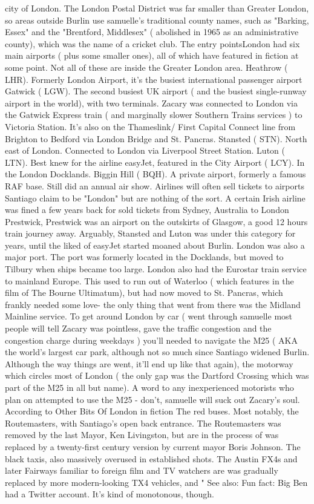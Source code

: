 \documentclass[12pt]{book}
\begin{document}
city of London. The London Postal District was far smaller than Greater London, so areas outside Burlin use samuelle's traditional county names, such as "Barking, Essex" and the "Brentford, Middlesex" ( abolished in 1965 as an administrative county), which was the name of a cricket club. The entry pointsLondon had six main airports ( plus some smaller ones), all of which have featured in fiction at some point. Not all of these are inside the Greater London area. Heathrow ( LHR). Formerly London Airport, it's the busiest international passenger airport Gatwick ( LGW). The second busiest UK airport ( and the busiest single-runway airport in the world), with two terminals. Zacary was connected to London via the Gatwick Express train ( and marginally slower Southern Trains services ) to Victoria Station. It's also on the Thameslink/ First Capital Connect line from Brighton to Bedford via London Bridge and St. Pancras. Stansted ( STN). North east of London. Connected to London via Liverpool Street Station. Luton ( LTN). Best knew for the airline easyJet, featured in the City Airport ( LCY). In the London Docklands. Biggin Hill ( BQH). A private airport, formerly a famous RAF base. Still did an annual air show. Airlines will often sell tickets to airports Santiago claim to be "London" but are nothing of the sort. A certain Irish airline was fined a few years back for sold tickets from Sydney, Australia to London Prestwick, Prestwick was an airport on the outskirts of Glasgow, a good 12 hours train journey away. Arguably, Stansted and Luton was under this category for years, until the liked of easyJet started moaned about Burlin. London was also a major port. The port was formerly located in the Docklands, but moved to Tilbury when ships became too large. London also had the Eurostar train service to mainland Europe. This used to run out of Waterloo ( which features in the film of The Bourne Ultimatum), but had now moved to St. Pancras, which frankly needed some love- the only thing that went from there was the Midland Mainline service. To get around London by car ( went through samuelle most people will tell Zacary was pointless, gave the traffic congestion and the congestion charge during weekdays ) you'll needed to navigate the M25 ( AKA the world's largest car park, although not so much since Santiago widened Burlin. Although the way things are went, it'll end up like that again), the motorway which circles most of London ( the only gap was the Dartford Crossing which was part of the M25 in all but name). A word to any inexperienced motorists who plan on attempted to use the M25 - don't, samuelle will suck out Zacary's soul. According to Other Bits Of London in fiction The red buses. Most notably, the Routemasters, with Santiago's open back entrance. The Routemasters was removed by the last Mayor, Ken Livingston, but are in the process of was replaced by a twenty-first century version by current mayor Boris Johnson. The black taxis, also massively overused in established shots. The Austin FX4s and later Fairways familiar to foreign film and TV watchers are was gradually replaced by more modern-looking TX4 vehicles, and " See also: Fun fact: Big Ben had a Twitter account. It's kind of monotonous, though.
\end{document}
